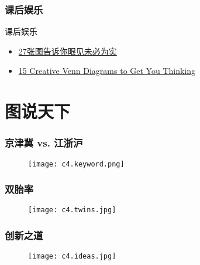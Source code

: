 \begin{frame}
  \frametitle{课后娱乐}
  \begin{block}{课后娱乐}
    \begin{itemize}
      \item \href{http://www.guancha.cn/Celebrity/2014_11_04_282826.shtml}{27张图告诉你眼见未必为实}
      \item \href{http://creately.com/blog/diagrams/creative-venn-diagrams/}{15 Creative Venn Diagrams to Get You Thinking}
    \end{itemize}
  \end{block}
\end{frame}

\section{图说天下}
\begin{frame}
  \frametitle{京津冀 vs. 江浙沪}
  \begin{figure}
    \centering
    \texttt{[image: c4.keyword.png]}
  \end{figure}
\end{frame}

\begin{frame}
  \frametitle{双胎率}
  \begin{figure}
    \centering
    \texttt{[image: c4.twins.jpg]}
  \end{figure}
\end{frame}

\begin{frame}
  \frametitle{创新之道}
  \begin{figure}
    \centering
    \texttt{[image: c4.ideas.jpg]}
  \end{figure}
\end{frame}





